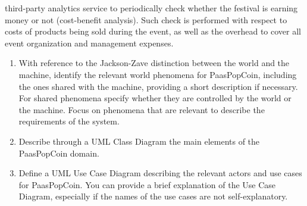 \documentclass[12pt, a4paper]{report}
\newtheorem[style=M,bodystyle=\normalfont]{theorem}{Theorem}
\newtheorem[style=M,bodystyle=\normalfont]{corollary}{Corollary}
\newtheorem[style=M,bodystyle=\normalfont]{lemma}{Lemma}
\newtheorem[style=M,bodystyle=\normalfont]{definition}{Definition}
\begin{document}
\begin{Exercise}[label=2]
        third-party analytics service to periodically check whether the festival is earning money or not (cost-benefit analysis). Such check is performed with respect to costs of 
        products being sold during the event, as well as the overhead to cover all event organization and management expenses. 
        \begin{enumerate}
            \item With reference to the Jackson-Zave distinction between the world and the machine, identify the relevant world phenomena for PaasPopCoin, including the ones shared 
                with the machine, providing a short description if necessary. For shared phenomena specify whether they are controlled by the world or the machine. Focus on phenomena 
                that are relevant to describe the requirements of the system.
            \item Describe through a UML Class Diagram the main elements of the PaasPopCoin domain. 
            \item Define a UML Use Case Diagram describing the relevant actors and use cases for PaasPopCoin. You can provide a brief explanation of the Use Case Diagram, especially 
                if the names of the use cases are not self-explanatory.
        \end{enumerate}
    \end{Exercise}
\end{document}
